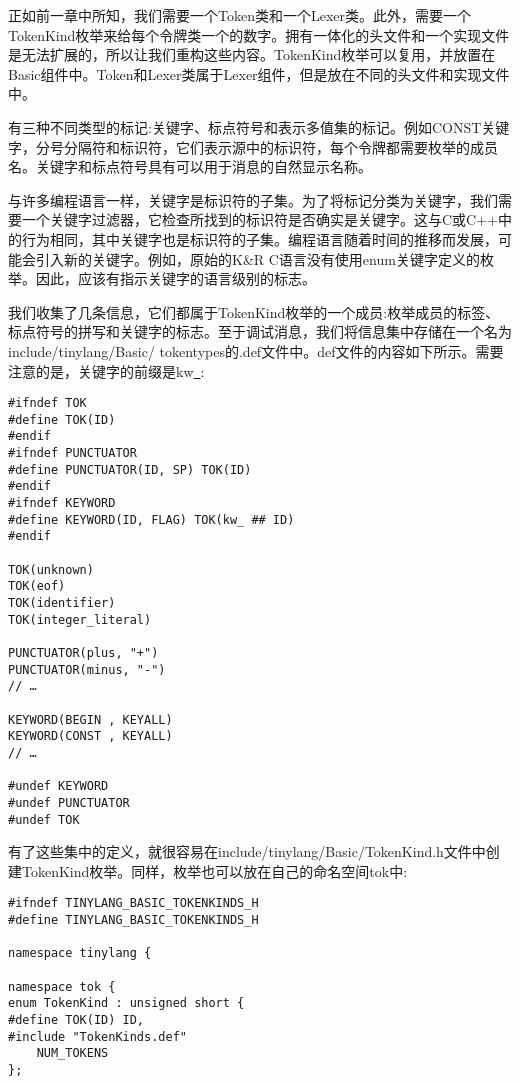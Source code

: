 正如前一章中所知，我们需要一个Token类和一个Lexer类。此外，需要一个TokenKind枚举来给每个令牌类一个的数字。拥有一体化的头文件和一个实现文件是无法扩展的，所以让我们重构这些内容。TokenKind枚举可以复用，并放置在Basic组件中。Token和Lexer类属于Lexer组件，但是放在不同的头文件和实现文件中。\par

有三种不同类型的标记:关键字、标点符号和表示多值集的标记。例如CONST关键字，分号分隔符和标识符，它们表示源中的标识符，每个令牌都需要枚举的成员名。关键字和标点符号具有可以用于消息的自然显示名称。\par

与许多编程语言一样，关键字是标识符的子集。为了将标记分类为关键字，我们需要一个关键字过滤器，它检查所找到的标识符是否确实是关键字。这与C或C++中的行为相同，其中关键字也是标识符的子集。编程语言随着时间的推移而发展，可能会引入新的关键字。例如，原始的K\&R C语言没有使用enum关键字定义的枚举。因此，应该有指示关键字的语言级别的标志。\par

我们收集了几条信息，它们都属于TokenKind枚举的一个成员:枚举成员的标签、标点符号的拼写和关键字的标志。至于调试消息，我们将信息集中存储在一个名为include/tinylang/Basic/ tokentypes的.def文件中。def文件的内容如下所示。需要注意的是，关键字的前缀是kw\underline{~}:\par

\begin{lstlisting}[caption={}]
#ifndef TOK
#define TOK(ID)
#endif
#ifndef PUNCTUATOR
#define PUNCTUATOR(ID, SP) TOK(ID)
#endif
#ifndef KEYWORD
#define KEYWORD(ID, FLAG) TOK(kw_ ## ID)
#endif

TOK(unknown)
TOK(eof)
TOK(identifier)
TOK(integer_literal)

PUNCTUATOR(plus, "+")
PUNCTUATOR(minus, "-")
// …

KEYWORD(BEGIN , KEYALL)
KEYWORD(CONST , KEYALL)
// …

#undef KEYWORD
#undef PUNCTUATOR
#undef TOK
\end{lstlisting}

有了这些集中的定义，就很容易在include/tinylang/Basic/TokenKind.h文件中创建TokenKind枚举。同样，枚举也可以放在自己的命名空间tok中:\par

\begin{lstlisting}[caption={}]
#ifndef TINYLANG_BASIC_TOKENKINDS_H
#define TINYLANG_BASIC_TOKENKINDS_H

namespace tinylang {
	
namespace tok {
enum TokenKind : unsigned short {
#define TOK(ID) ID,
#include "TokenKinds.def"
	NUM_TOKENS
};
\end{lstlisting}

